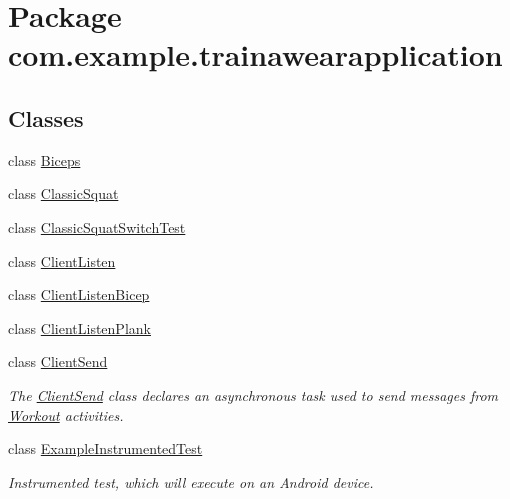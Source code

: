 \hypertarget{namespacecom_1_1example_1_1trainawearapplication}{}\section{Package com.\+example.\+trainawearapplication}
\label{namespacecom_1_1example_1_1trainawearapplication}
\subsection*{Classes}
\begin{DoxyCompactItemize}
\item 
class \mbox{\hyperlink{classcom_1_1example_1_1trainawearapplication_1_1_biceps}{Biceps}}
\item 
class \mbox{\hyperlink{classcom_1_1example_1_1trainawearapplication_1_1_classic_squat}{Classic\+Squat}}
\item 
class \mbox{\hyperlink{classcom_1_1example_1_1trainawearapplication_1_1_classic_squat_switch_test}{Classic\+Squat\+Switch\+Test}}
\item 
class \mbox{\hyperlink{classcom_1_1example_1_1trainawearapplication_1_1_client_listen}{Client\+Listen}}
\item 
class \mbox{\hyperlink{classcom_1_1example_1_1trainawearapplication_1_1_client_listen_bicep}{Client\+Listen\+Bicep}}
\item 
class \mbox{\hyperlink{classcom_1_1example_1_1trainawearapplication_1_1_client_listen_plank}{Client\+Listen\+Plank}}
\item 
class \mbox{\hyperlink{classcom_1_1example_1_1trainawearapplication_1_1_client_send}{Client\+Send}}
\begin{DoxyCompactList}\small\item\em The \mbox{\hyperlink{classcom_1_1example_1_1trainawearapplication_1_1_client_send}{Client\+Send}} class declares an asynchronous task used to send messages from \mbox{\hyperlink{classcom_1_1example_1_1trainawearapplication_1_1_workout}{Workout}} activities. \end{DoxyCompactList}\item 
class \mbox{\hyperlink{classcom_1_1example_1_1trainawearapplication_1_1_example_instrumented_test}{Example\+Instrumented\+Test}}
\begin{DoxyCompactList}\small\item\em Instrumented test, which will execute on an Android device. \end{DoxyCompactList}\item 

\end{DoxyCompactItemize}
